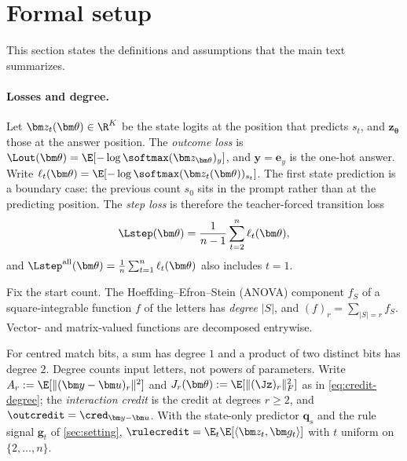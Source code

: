 \providecommand{\reg}[1]{\ensuremath{\mathsf{#1}}}

\section{Formal setup}
\label{app:formal}

This section states the definitions and assumptions that the main text summarizes.

\paragraph{Losses and degree.}

\begin{definition}
\label{def:losses}
Let $\bm z_t(\bm\theta)\in\R^K$ be the state logits at the position that predicts $s_t$, and $\bm z_{\bm\theta}$
those at the answer position. The \emph{outcome loss} is $\Lout(\bm\theta)=\E[-\log\softmax(\bm z_{\bm\theta})_y]$, and $\bm y=\bm e_y$ is the one-hot answer.
Write $\ell_t(\bm\theta)=\E[-\log\softmax(\bm z_t(\bm\theta))_{s_t}]$. The first state prediction is a boundary case: the previous
count $s_0$ sits in the prompt rather than at the predicting position. The \emph{step loss} is therefore the teacher-forced
transition loss
\[
 \Lstep(\bm\theta)=\frac{1}{n-1}\sum_{t=2}^n\ell_t(\bm\theta),
\]
and $\Lstep^{\mathrm{all}}(\bm\theta)=\tfrac{1}{n}\sum_{t=1}^n\ell_t(\bm\theta)$ also includes $t=1$.
\end{definition}

\begin{definition}[Degree]
\label{def:degree}
Fix the start count. The Hoeffding--Efron--Stein (ANOVA) component $f_S$ of a square-integrable function $f$ of the letters has
\emph{degree} $|S|$, and $(f)_r=\sum_{|S|=r}f_S$. Vector- and matrix-valued functions are decomposed entrywise.
\end{definition}
For centred match bits, a sum has degree $1$ and a product of two distinct bits has degree $2$.
Degree counts input letters, not powers of parameters. Write $A_r:=\E[\|(\bm y-\bm u)_r\|^2]$ and $J_r(\bm\theta):=\E[\|(\Jz)_r\|_F^2]$ as in \cref{eq:credit-degree}; the
\emph{interaction credit} is the credit at degrees $r\ge2$, and $\outcredit=\cred_{\bm y-\bm u}$. With the state-only predictor
$\bm q_s$ and the rule signal $\bm g_t$ of \cref{sec:setting}, $\rulecredit=\E_t\E[\langle\bm z_t,\bm g_t\rangle]$ with $t$ uniform on $\{2,\ldots,n\}$.

